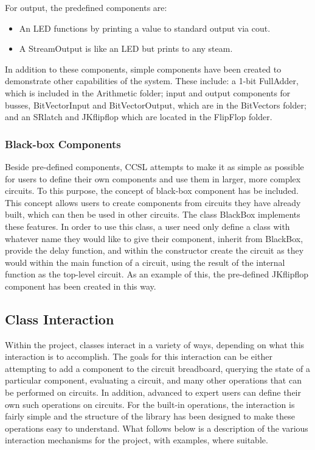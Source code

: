 \documentclass{article}
\begin{document}
For output, the predefined components are:

\begin{itemize}

\item An LED functions by printing a value to standard output via cout.

\item A StreamOutput is like an LED but prints to any steam.

\end{itemize}

In addition to these components, simple components have been created to demonstrate other capabilities of the system. These include: a 1-bit FullAdder, which is included in the Arithmetic folder; input and output components for busses, BitVectorInput and BitVectorOutput, which are in the BitVectors folder; and an SRlatch and JKflipflop which are located in the FlipFlop folder.

\subsubsection{Black-box Components}

Beside pre-defined components, CCSL attempts to make it as simple as possible for users to define their own components and use them in larger, more complex circuits. To this purpose, the concept of black-box component has be included. This concept allows users to create components from circuits they have already built, which can then be used in other circuits. The class BlackBox implements these features. In order to use this class, a user need only define a class with whatever name they would like to give their component, inherit from BlackBox, provide the delay function, and within the constructor create the circuit as they would within the main function of a circuit, using the result of the internal function as the top-level circuit. As an example of this, the pre-defined JKflipflop component has been created in this way.

\subsection{Class Interaction}

Within the project, classes interact in a variety of ways, depending on what this interaction is to accomplish. The goals for this interaction can be either attempting to add a component to the circuit breadboard, querying the state of a particular component, evaluating a circuit, and many other operations that can be performed on circuits. In addition, advanced to expert users can define their own such operations on circuits. For the built-in operations, the interaction is fairly simple and the structure of the library has been designed to make these operations easy to understand. What follows below is a description of the various interaction mechanisms for the project, with examples, where suitable.
\end{document}
